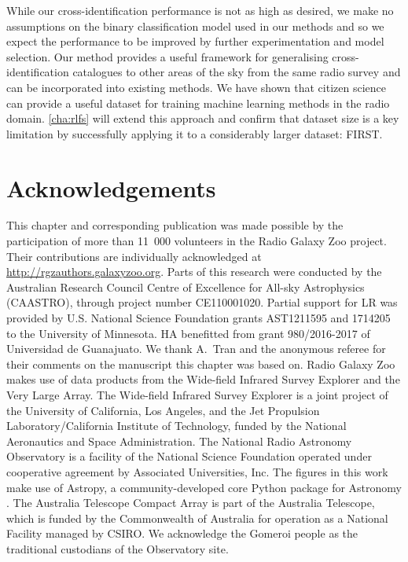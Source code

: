   While our cross-identification performance is not as high as desired, we
  make no assumptions on the binary classification model used in our methods
  and so we expect the performance to be improved by further experimentation
  and model selection. Our method provides a useful framework for generalising
  cross-identification catalogues to other areas of the sky from the same
  radio survey and can be incorporated into existing methods. {We have
  shown that citizen science can provide a useful dataset for training machine
  learning methods in the radio domain.} \autoref{cha:rlfs} will extend this
  approach and confirm that dataset size is a key limitation by successfully applying it to a considerably larger dataset: FIRST.

\section{Acknowledgements}

  This chapter and corresponding publication was made possible by the participation of more than
  11~000 volunteers in the Radio Galaxy Zoo project. Their contributions are
  individually acknowledged at \url{http://rgzauthors.galaxyzoo.org}. Parts of
  this research were conducted by the Australian Research Council Centre of
  Excellence for All-sky Astrophysics (CAASTRO), through project number
  CE110001020. Partial support for LR was provided by U.S. National Science
  Foundation grants AST1211595 and 1714205 to the University of Minnesota. HA
  benefitted from grant 980/2016-2017 of Universidad de Guanajuato. We thank
  A.~Tran and the anonymous referee for their comments on the manuscript this chapter was based on.
  Radio Galaxy Zoo makes use of
  data products from the Wide-field Infrared Survey Explorer and the Very
  Large Array. The Wide-field Infrared Survey Explorer is a joint project of
  the University of California, Los Angeles, and the Jet Propulsion
  Laboratory/California Institute of Technology, funded by the National
  Aeronautics and Space Administration. The National Radio Astronomy
  Observatory is a facility of the National Science Foundation operated under
  cooperative agreement by Associated Universities, Inc. The figures
  in this work make use of Astropy, a community-developed core Python package
  for Astronomy \citep{astropy}. The Australia Telescope Compact Array is part
  of the Australia Telescope, which is funded by the Commonwealth of Australia
  for operation as a National Facility managed by CSIRO. We acknowledge the Gomeroi people as the traditional custodians of the Observatory site.




